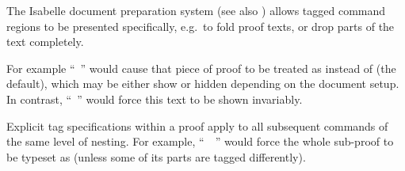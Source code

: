 \begin{isabellebody}
\begin{isamarkuptext}
  \medskip The Isabelle document preparation system (see also
  \cite{isabelle-sys}) allows tagged command regions to be presented
  specifically, e.g.\ to fold proof texts, or drop parts of the text
  completely.

  For example ``\mbox{}~'' would
  cause that piece of proof to be treated as  instead
  of  (the default), which may be either show or hidden
  depending on the document setup.  In contrast, ``\mbox{}~'' would force this text to be shown
  invariably.

  Explicit tag specifications within a proof apply to all subsequent
  commands of the same level of nesting.  For example, ``\mbox{}~~\mbox{}'' would force the
  whole sub-proof to be typeset as  (unless some of its
  parts are tagged differently).%
\end{isamarkuptext}%
\isamarkuptrue%
%
\isadelimtheory
%
\endisadelimtheory
%
\isatagtheory
{}\isamarkupfalse%
%
\endisatagtheory
{\isafoldtheory}%
%
\isadelimtheory
%
\endisadelimtheory
\isanewline
\end{isabellebody}%
